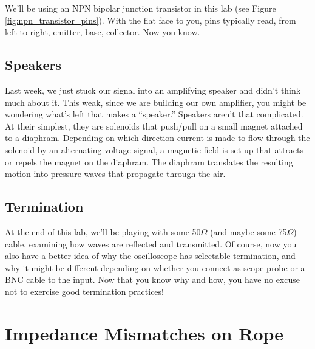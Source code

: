 \documentclass[11pt]{article}
\begin{document}
We'll be using an NPN bipolar junction transistor in this lab (see Figure \ref{fig:npn_transistor_pins}).  With
the flat face to you, pins typically read, from left to right, emitter, base, collector.  Now you know.

\subsection*{Speakers}

Last week, we just stuck our signal into an amplifying speaker and didn't think much about it.  This weak, since we are building our own amplifier, you might be wondering what's left that makes a ``speaker.''  Speakers aren't
that complicated.  At their simplest, they are solenoids that push/pull on a small magnet
attached to a diaphram.  Depending on which direction current is made to flow through the solenoid by an
alternating voltage signal, a magnetic field is set up that attracts or repels the magnet on the diaphram.  The
diaphram translates the resulting motion into pressure waves that propagate through the air.

\subsection*{Termination}

At the end of this lab, we'll be playing with some 50$\Omega$ (and maybe some 75$\Omega$) cable, examining how
waves are reflected and transmitted.  Of course, now you also have a better idea of why the oscilloscope
has selectable termination, and why it might be different depending on whether you connect as scope probe
or a BNC cable to the input.  Now that you know why and how, you have no excuse not to exercise good termination
practices!

\section{Impedance Mismatches on Rope}
\end{document}
